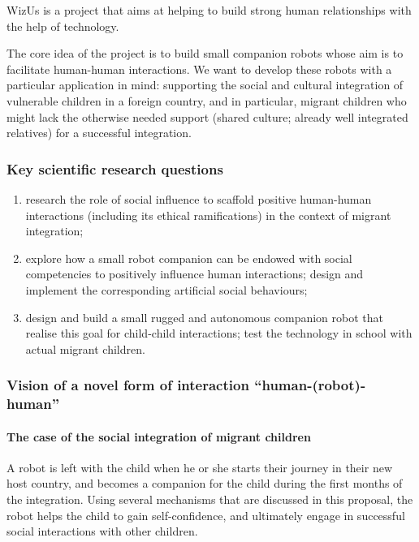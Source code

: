 \documentclass[]{article}
\newcommand{\project}{WizUs\xspace}
\begin{document}
\project is a project that aims at helping to build strong human
relationships with the help of technology.

The core idea of the project is to build small companion robots whose
aim is to facilitate human-human interactions. We want to develop these
robots with a particular application in mind: supporting the social and
cultural integration of vulnerable children in a foreign country, and in
particular, migrant children who might lack the otherwise needed support
(shared culture; already well integrated relatives) for a successful
integration.

\subsubsection{Key scientific research questions}

\begin{enumerate}
\item research the role of social influence to scaffold positive human-human
    interactions (including its ethical ramifications) in the context of migrant
    integration;
\item explore how a small robot companion can be endowed with social
    competencies to positively influence human interactions; design and
    implement the corresponding artificial social behaviours;
\item design and build a small rugged and autonomous companion robot that
    realise this goal for child-child interactions; test the technology in
    school with actual migrant children.
\end{enumerate}

\subsubsection{Vision of a novel form of interaction ``human-(robot)-human''}

\paragraph{The case of the social integration of migrant children}

A robot is left with the child when he or she starts their journey in
their new host country, and becomes a companion for the child during the
first months of the integration. Using several mechanisms that are
discussed in this proposal, the robot helps the child to gain
self-confidence, and ultimately engage in successful social interactions
with other children.
\end{document}
